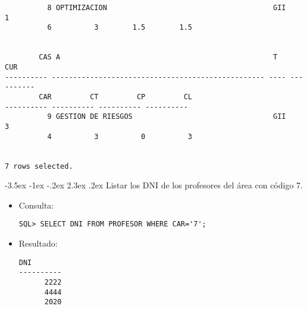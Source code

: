 \documentclass[11pt]{report}
\makeatletter
\renewcommand\chapter{\@startsection{chapter}{0}{\z@}%
    {-3.5ex \@plus -1ex \@minus -.2ex}%
    {2.3ex \@plus.2ex}%
    {\normalfont\Large\bfseries}}
\makeatother
\begin{document}
\begin{itemize}
\begin{verbatim}
          8 OPTIMIZACION                                       GII           1   
          6          3        1.5        1.5                                     
                                                                                

        CAS A                                                  T           CUR   
---------- -------------------------------------------------- ---- ----------   
        CAR         CT         CP         CL                                     
---------- ---------- ---------- ----------                                     
          9 GESTION DE RIESGOS                                 GII           3   
          4          3          0          3                                     
                                                                                

7 rows selected.
  \end{verbatim}
\end{itemize}

\chapter{Listar los DNI de los profesores del área con código 7.}
\begin{itemize}
  \item Consulta:
  \begin{verbatim}
SQL> SELECT DNI FROM PROFESOR WHERE CAR='7';
  \end{verbatim}
  \item{Resultado:}
  \begin{verbatim}
DNI                                                                      
----------                                                                      
      2222                                                                      
      4444                                                                      
      2020
  \end{verbatim}
\end{itemize}

\end{document}
